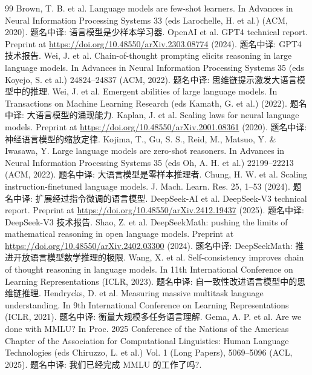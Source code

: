 \begin{thebibliography}{99}
 Brown, T. B. et al. Language models are few-shot learners. In Advances in Neural Information Processing Systems 33 (eds Larochelle, H. et al.) (ACM, 2020). 题名中译: 语言模型是少样本学习器.
 OpenAI et al. GPT4 technical report. Preprint at \url{https://doi.org/10.48550/arXiv.2303.08774} (2024). 题名中译: GPT4 技术报告.
 Wei, J. et al. Chain-of-thought prompting elicits reasoning in large language models. In Advances in Neural Information Processing Systems 35 (eds Koyejo, S. et al.) 24824--24837 (ACM, 2022). 题名中译: 思维链提示激发大语言模型中的推理.
 Wei, J. et al. Emergent abilities of large language models. In Transactions on Machine Learning Research (eds Kamath, G. et al.) (2022). 题名中译: 大语言模型的涌现能力.
 Kaplan, J. et al. Scaling laws for neural language models. Preprint at \url{https://doi.org/10.48550/arXiv.2001.08361} (2020). 题名中译: 神经语言模型的缩放定律.
 Kojima, T., Gu, S. S., Reid, M., Matsuo, Y. \& Iwasawa, Y. Large language models are zero-shot reasoners. In Advances in Neural Information Processing Systems 35 (eds Oh, A. H. et al.) 22199--22213 (ACM, 2022). 题名中译: 大语言模型是零样本推理者.
 Chung, H. W. et al. Scaling instruction-finetuned language models. J. Mach. Learn. Res. 25, 1--53 (2024). 题名中译: 扩展经过指令微调的语言模型.
 DeepSeek-AI et al. DeepSeek-V3 technical report. Preprint at \url{https://doi.org/10.48550/arXiv.2412.19437} (2025). 题名中译: DeepSeek-V3 技术报告.
 Shao, Z. et al. DeepSeekMath: pushing the limits of mathematical reasoning in open language models. Preprint at \url{https://doi.org/10.48550/arXiv.2402.03300} (2024). 题名中译: DeepSeekMath: 推进开放语言模型数学推理的极限.
 Wang, X. et al. Self-consistency improves chain of thought reasoning in language models. In 11th International Conference on Learning Representations (ICLR, 2023). 题名中译: 自一致性改进语言模型中的思维链推理.
 Hendrycks, D. et al. Measuring massive multitask language understanding. In 9th International Conference on Learning Representations (ICLR, 2021). 题名中译: 衡量大规模多任务语言理解.
 Gema, A. P. et al. Are we done with MMLU? In Proc. 2025 Conference of the Nations of the Americas Chapter of the Association for Computational Linguistics: Human Language Technologies (eds Chiruzzo, L. et al.) Vol. 1 (Long Papers), 5069--5096 (ACL, 2025). 题名中译: 我们已经完成 MMLU 的工作了吗?.

\end{thebibliography}
